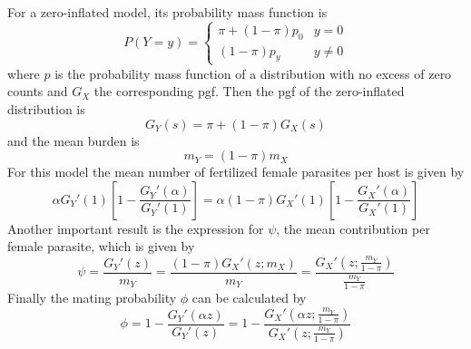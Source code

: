 \documentclass[bimj,fleqn]{w-art}
\theoremstyle{plain}
\theoremstyle{definition}
\begin{document}
For a zero-inflated model, its probability mass function is 
\begin{equation*}\label{zid}
P(Y=y)= \left\{ \begin{array}{lc}
\pi + (1-\pi)p_0 & y=0 \\
(1-\pi)p_y  & y\neq 0
\end{array}
\right.
\end{equation*}
where $p$ is the probability mass function of a distribution with no excess of zero counts and $G_X$ the corresponding pgf. 
Then the pgf of the zero-inflated distribution is
\begin{equation*}
G_Y(s)=\pi+(1-\pi)G_X(s)
\end{equation*}
and the mean burden is  %
\begin{equation*}
m_Y=(1-\pi)m_X
\end{equation*}
For this model the mean number of fertilized female parasites per host is given by
\begin{equation*}
\alpha G_Y'(1) \left[1-  \frac{G_Y'(\alpha )}{ G_Y'(1)}\right]=\alpha (1-\pi) G_X'(1) 
\left[1 - \frac{G_X'(\alpha)}{G_X'(1)}\right]    
\end{equation*}
Another important result is the expression for $\psi$, the mean contribution per female parasite, which is given by
\begin{equation}\label{zipsi}
\psi= \frac{G_Y'(z)}{m_Y}=  \frac{(1-\pi)G_X'(z;m_X)}{m_Y}=\frac{G_X'\left( z;\frac{m_Y}{1-\pi}\right) }{\frac{m_Y}{1-\pi}} 
\end{equation}
Finally the mating probability $\phi$ can be calculated by     
\begin{equation}\label{ziphi}
\phi=1-\frac{G_Y'(\alpha z)}{G_Y'(z)}=1-\frac{G_X'\left(\alpha z;\frac{m_Y}{1-\pi}\right)}{G_X'\left( z;\frac{m_Y}{1-\pi}\right)} 
\end{equation}
\end{document}

